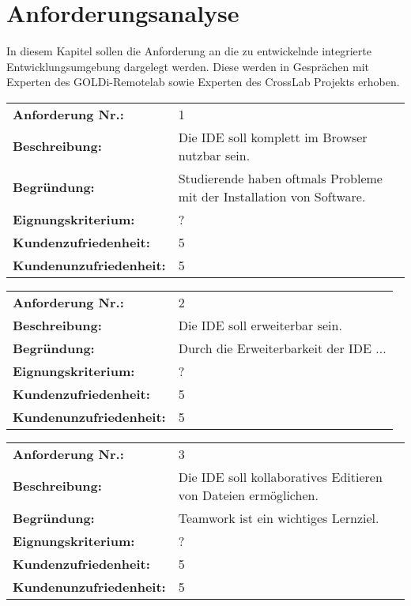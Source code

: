 \chapter{Anforderungsanalyse} \label{anforderungsanalyse}

In diesem Kapitel sollen die Anforderung an die zu entwickelnde integrierte Entwicklungsumgebung dargelegt werden. Diese werden in Gesprächen mit Experten des GOLDi-Remotelab sowie Experten des CrossLab Projekts erhoben.

\begin{tabularx}{\textwidth}{|lX|}
    \hline
    \textbf{Anforderung Nr.:}     & 1                                                                     \\
    \textbf{Beschreibung:}        & Die IDE soll komplett im Browser nutzbar sein.                        \\
    \textbf{Begründung:}          & Studierende haben oftmals Probleme mit der Installation von Software. \\
    \textbf{Eignungskriterium:}   & ?                                                                     \\
    \textbf{Kundenzufriedenheit:} & 5                                                                     \\ \textbf{Kundenunzufriedenheit:} & 5 \\
    \hline
\end{tabularx}

\begin{tabularx}{\textwidth}{|lX|}
    \hline
    \textbf{Anforderung Nr.:}     & 2                                     \\
    \textbf{Beschreibung:}        & Die IDE soll erweiterbar sein.        \\
    \textbf{Begründung:}          & Durch die Erweiterbarkeit der IDE ... \\
    \textbf{Eignungskriterium:}   & ?                                     \\
    \textbf{Kundenzufriedenheit:} & 5                                     \\ \textbf{Kundenunzufriedenheit:} & 5 \\
    \hline
\end{tabularx}

\begin{tabularx}{\textwidth}{|lX|}
    \hline
    \textbf{Anforderung Nr.:}     & 3                                                              \\
    \textbf{Beschreibung:}        & Die IDE soll kollaboratives Editieren von Dateien ermöglichen. \\
    \textbf{Begründung:}          & Teamwork ist ein wichtiges Lernziel.                           \\
    \textbf{Eignungskriterium:}   & ?                                                              \\
    \textbf{Kundenzufriedenheit:} & 5                                                              \\ \textbf{Kundenunzufriedenheit:} & 5 \\
    \hline
\end{tabularx}

